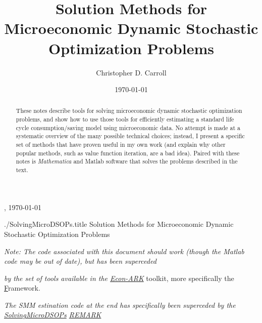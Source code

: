 \documentclass[titlepage]{\econtex}
\providecommand{\textname}{SolvingMicroDSOPs}
\begin{document}

\hfill{\tiny \jobname, \today}

\begin{verbatimwrite}{./\textname.title}
Solution Methods for Microeconomic Dynamic Stochastic Optimization Problems
\end{verbatimwrite}

\title{Solution Methods for Microeconomic Dynamic Stochastic Optimization Problems}

\author{Christopher D. Carroll\authNum}


\date{\today}
\maketitle

\centerline{\emph{Note: The code associated with this document should work (though the Matlab code may be out of date), but has been superceded}}
\centerline{\emph{by the set of tools available in the \href{https://github.com/econ-ark/HARK}{Econ-ARK}} toolkit, more specifically the \href{https://github.com/econ-ark/HARK} Framework.}
\centerline{\emph{The SMM estination code at the end has specifically been superceded by the \href{https://github.com/econ-ark/REMARK/tree/master/REMARKs/SolvingMicroDSOPs}{SolvingMicroDSOPs} \href{https://github.com/econ-ark/REMARK}{REMARK}}}

\hypertarget{Abstract}{}
\begin{abstract}
  These notes describe tools for solving microeconomic dynamic
  stochastic optimization problems, and show how to use those tools
  for efficiently estimating a standard life cycle consumption/saving model
  using microeconomic data.  No attempt is made at a systematic
  overview of the many possible technical choices; instead, I present
  a specific set of methods that have proven useful in my own work
  (and explain why other popular methods, such as value function
  iteration, are a bad idea).  Paired with these notes is \textit{Mathematica} and Matlab software that solves the problems
  described in the text.
\end{abstract}
\end{document}
